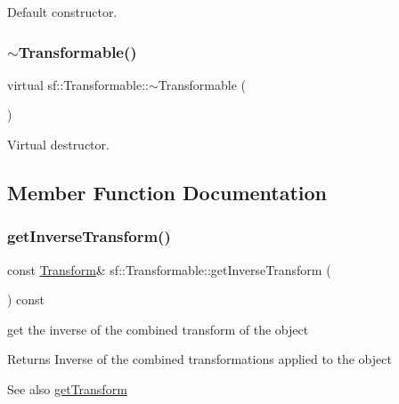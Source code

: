 Default constructor. 

\begin{DoxyVerb}\end{DoxyVerb}
 \mbox{\label{classsf_1_1_transformable_a43253abcb863195a673c2a347a7425cc}} 
\subsubsection{\texorpdfstring{$\sim$Transformable()}{~Transformable()}}
{\footnotesize\ttfamily virtual sf\+::\+Transformable\+::$\sim$\+Transformable (\begin{DoxyParamCaption}{ }\end{DoxyParamCaption})\hspace{0.3cm}{\ttfamily [virtual]}}



Virtual destructor. 

\begin{DoxyVerb}\end{DoxyVerb}
 

\subsection{Member Function Documentation}
\mbox{\label{classsf_1_1_transformable_ab18b25f51263252ff3811465eb7e9fb1}} 
\subsubsection{\texorpdfstring{getInverseTransform()}{getInverseTransform()}}
{\footnotesize\ttfamily const \mbox{\hyperlink{classsf_1_1_transform}{Transform}}\& sf\+::\+Transformable\+::get\+Inverse\+Transform (\begin{DoxyParamCaption}{ }\end{DoxyParamCaption}) const}



get the inverse of the combined transform of the object 

\begin{DoxyReturn}{Returns}
Inverse of the combined transformations applied to the object
\end{DoxyReturn}
\begin{DoxySeeAlso}{See also}
\mbox{\hyperlink{classsf_1_1_transformable_a7f7c3f0bab3f162b13613904fbdbb9ad}{get\+Transform}} \begin{DoxyVerb}\end{DoxyVerb}
 
\end{DoxySeeAlso}
\mbox{\label{classsf_1_1_transformable_a37ea3500afac234814a43ce809ef264e}} 
